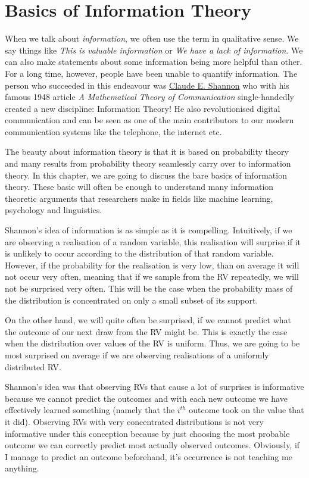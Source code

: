 \section{Basics of Information Theory}

When we talk about \textit{information}, we often use the term in qualitative sense. We say things like 
\textit{This is valuable information} or 
\textit{We have a lack of information}. We can also make statements about some information being more helpful than other. For a long time, however,
people have been unable to quantify information. The person who succeeded in this endeavour was \href{https://en.wikipedia.org/wiki/Claude_Shannon}{Claude E. Shannon}
who with his famous 1948 article \textit{A Mathematical Theory of Communication} single-handedly created a new discipline: Information Theory! He also revolutionised
digital communication and can be seen as one of the main contributors to our modern communication systems like the telephone, the internet etc. 

The beauty about information theory is that it is based on probability theory and many results from probability theory seamlessly carry over to information theory.
In this chapter, we are going to discuss the bare basics of information theory. These basic will often be enough to understand many information theoretic arguments
that researchers make in fields like machine learning, psychology and linguistics.

Shannon's idea of information is as simple as it is compelling. Intuitively, if we are observing a realisation of a random variable, this realisation will surprise
if it is unlikely to occur according to the distribution of that random variable. However, if the probability for the realisation is very low, than on average it
will not occur very often, meaning that if we sample from the RV repeatedly, we will not be surprised very often. This will be the case when the probability
mass of the distribution is concentrated on only a small subset of its support. 

On the other hand, we will quite often be surprised,
if we cannot predict what the outcome of our next draw from the RV might be. This is exactly the case when the distribution over values of the RV is uniform. Thus,
we are going to be most surprised on average if we are observing realisations of a uniformly distributed RV.

Shannon's idea was that observing RVs that cause a lot of surprises is informative because we cannot predict the outcomes and with each new outcome we have effectively
learned something  (namely that the $ i^{th} $ outcome took on the value that it did). Observing RVs with very concentrated distributions is not very informative
under this conception because by just choosing the most probable outcome we can correctly predict most actually observed outcomes. Obviously, if I manage to predict
an outcome beforehand, it's occurrence is not teaching me anything.

